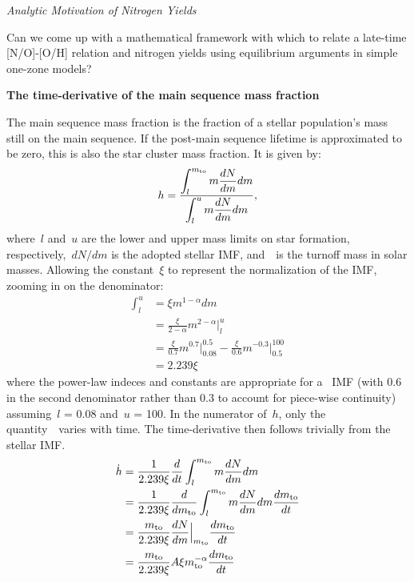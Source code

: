 \documentclass[\main/notes.tex]{subfiles}
\begin{document}

\twolineskip 
\null 
\twolineskip 
{\Large \textit{Analytic Motivation of Nitrogen Yields}} 
\par\noindent 
Can we come up with a mathematical framework with which to relate a late-time 
[N/O]-[O/H] relation and nitrogen yields using equilibrium arguments in simple 
one-zone models? 
\par 
\textbf{The time-derivative of the main sequence mass fraction} 
\par\noindent 
The main sequence mass fraction is the fraction of a stellar population's mass 
still on the main sequence. 
If the post-main sequence lifetime is approximated to be zero, this is also the 
star cluster mass fraction. 
It is given by: 
\begin{equation} 
h = \frac{\displaystyle 
	\int_l^{m_\text{to}} m\frac{dN}{dm} dm  
}{\displaystyle 
	\int_l^u m\frac{dN}{dm} dm 
} , 
\end{equation}
where~$l$ and~$u$ are the lower and upper mass limits on star formation, 
respectively,~$dN/dm$ is the adopted stellar IMF, and~\mto~is the turnoff mass 
in solar masses. 
Allowing the constant~$\xi$ to represent the normalization of the IMF, zooming 
in on the denominator: 
\begin{subequations}\begin{align} 
\int_l^u &= \xi m^{1 - \alpha} dm \\ 
&= \frac{\xi}{2 - \alpha} m^{2 - \alpha}\Big|_l^u \\ 
&= \frac{\xi}{0.7}m^{0.7}\Big|_{0.08}^{0.5} - 
\frac{\xi}{0.6}m^{-0.3}\Big|_{0.5}^{100} \\ 
&= 2.239\xi 
\end{align}\end{subequations} 
where the power-law indeces and constants are appropriate for 
a~\citet{Kroupa2001} IMF (with 0.6 in the second denominator rather than 0.3 
to account for piece-wise continuity) assuming~$l$ = 0.08 and~$u$ = 100. 
In the numerator of~$h$, only the quantity~\mto~varies with time. 
The time-derivative then follows trivially from the stellar IMF. 
\begin{subequations}\begin{align} 
\dot{h} &= \frac{1}{2.239\xi} \frac{d}{dt} 
\int_l^{m_\text{to}} m \frac{dN}{dm} dm 
\\ 
&= \frac{1}{2.239\xi} \frac{d}{dm_\text{to}} 
\int_l^{m_\text{to}} m \frac{dN}{dm} dm \frac{dm_\text{to}}{dt} 
\\ 
&= \frac{m_\text{to}}{2.239\xi} \frac{dN}{dm} \Big|_{m_\text{to}} \frac{dm_\text{to}}{dt} 
\\ 
&= \frac{m_\text{to}}{2.239\xi} A\xi m_\text{to}^{-\alpha} \frac{dm_\text{to}}{dt} 
\end{align}\end{subequations} 
\end{document}
